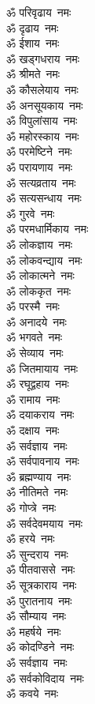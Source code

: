 \begin{multicols}{2}
\begin{flushleft}
ॐ परिवृढाय~नमः\\
ॐ दृढाय~नमः\\
ॐ ईशाय~नमः\\
ॐ खड्गधराय~नमः\\
ॐ श्रीमते~नमः\\
ॐ कौसलेयाय~नमः\\
ॐ अनसूयकाय~नमः\\
ॐ विपुलांसाय~नमः\\
ॐ महोरस्काय~नमः\\
ॐ परमेष्टिने~नमः\hfill{}\\
ॐ परायणाय~नमः\\
ॐ सत्यव्रताय~नमः\\
ॐ सत्यसन्धाय~नमः\\
ॐ गुरवे~नमः\\
ॐ परमधार्मिकाय~नमः\\
ॐ लोकज्ञाय~नमः\\
ॐ लोकवन्द्याय~नमः\\
ॐ लोकात्मने~नमः\\
ॐ लोककृत~नमः\\
ॐ परस्मै~नमः\hfill{}\\
ॐ अनादये~नमः\\
ॐ भगवते~नमः\\
ॐ सेव्याय~नमः\\
ॐ जितमायाय~नमः\\
ॐ रघूद्वहाय~नमः\\
ॐ रामाय~नमः\\
ॐ दयाकराय~नमः\\
ॐ दक्षाय~नमः\\
ॐ सर्वज्ञाय~नमः\\
ॐ सर्वपावनाय~नमः\hfill{}\\
ॐ ब्रह्मण्याय~नमः\\
ॐ नीतिमते~नमः\\
ॐ गोप्त्रे~नमः\\
ॐ सर्वदेवमयाय~नमः\\
ॐ हरये~नमः\\
ॐ सुन्दराय~नमः\\
ॐ पीतवाससे~नमः\\
ॐ सूत्रकाराय~नमः\\
ॐ पुरातनाय~नमः\\
ॐ सौम्याय~नमः\hfill{}\\
ॐ महर्षये~नमः\\
ॐ कोदण्डिने~नमः\\
ॐ सर्वज्ञाय~नमः\\
ॐ सर्वकोविदाय~नमः\\
ॐ कवये~नमः\\

\end{flushleft}
\end{multicols}
